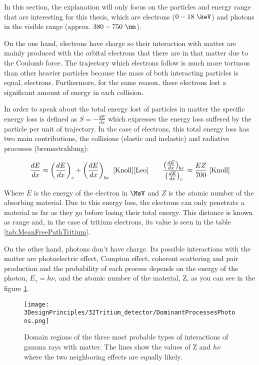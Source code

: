 In this section, the explanation will only focus on the particles and energy range that are interesting for this thesis, which are electrons ($0-18~\keV$) and photons in the visible range (approx. $380-750~\nm$).

On the one hand, electrons have charge so their interaction with matter are mainly produced with the orbital electrons that there are in that matter due to the Coulomb force. The trajectory which electrons follow is much more tortuous than other heavier particles because the mass of both interacting particles is equal, electrons. Furthermore, for the same reason, these electrons lost a significant amount of energy in each collision.

In order to speak about the total energy lost of particles in matter the specific energy loss is defined as $S=-\frac{dE}{dx}$ which expresses the energy loss suffered by the particle per unit of trajectory. In the case of electrons, this total energy loss has two main contributions, the collisions (elastic and inelastic) and radiative processes (bremsstrahlung):

\begin{equation}
\frac{dE}{dx} \approx \left(\frac{dE}{dx}\right)_{c} + \left(\frac{dE}{dx}\right)_{br} ~\cite{Knoll} \cite{Leo} \qquad  \frac{\left(\frac{dE}{dx}\right)_{br}}{\left(\frac{dE}{dx}\right)_{c}} \approx \frac{EZ}{700} ~\cite{Knoll}
\label{eq:ElectronInteraction}
\end{equation}

Where $E$ is the energy of the electron in $\MeV$ and $Z$ is the atomic number of the absorbing material. Due to this energy loss, the electrons can only penetrate a material as far as they go before losing their total energy. This distance is known as range and, in the case of tritium electrons, its value is seen in the table \ref{tab:MeanFreePathTritium}.

On the other hand, photons don't have charge. Its possible interactions with the matter are photoelectric effect, Compton effect, coherent scattering and pair production and the probability of each process depends on the energy of the photon, $E_\gamma = h\nu$, and the atomic number of the material, Z, as you can see in the figure \ref{fig:ProcessesPhotons}.

\begin{figure}[htbp]
\centering
\texttt{[image: 3DesignPrinciples/32Tritium\_detector/DominantProcessesPhotons.png]}
\caption{Domain regions of the three most probable types of interactions of gamma rays with matter. The lines show the values of Z and $h\nu$ where the two neighboring effects are equally likely.\label{fig:ProcessesPhotons}~\cite{Knoll}~\cite{Leo}}
\end{figure}

